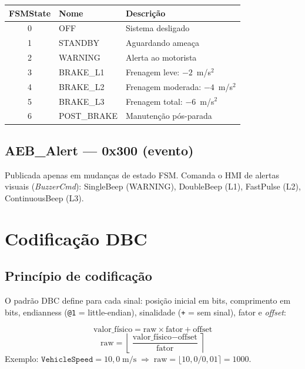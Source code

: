 \documentclass[12pt,a4paper]{article}
\begin{document}
\begin{center}
\begin{tabular}{cll}
  \toprule
  \textbf{FSMState} & \textbf{Nome} & \textbf{Descrição} \\
  \midrule
  0 & OFF       & Sistema desligado \\
  1 & STANDBY   & Aguardando ameaça \\
  2 & WARNING   & Alerta ao motorista \\
  3 & BRAKE\_L1 & Frenagem leve: $-2$~m/s$^2$ \\
  4 & BRAKE\_L2 & Frenagem moderada: $-4$~m/s$^2$ \\
  5 & BRAKE\_L3 & Frenagem total: $-6$~m/s$^2$ \\
  6 & POST\_BRAKE& Manutenção pós-parada \\
  \bottomrule
\end{tabular}
\end{center}

\subsection{AEB\_Alert --- 0x300 (evento)}

Publicada apenas em mudanças de estado FSM. Comanda o HMI de alertas
visuais (\textit{BuzzerCmd}): SingleBeep (WARNING), DoubleBeep (L1),
FastPulse (L2), ContinuousBeep (L3).

\section{Codificação DBC}
\label{sec:codificacao}

\subsection{Princípio de codificação}

O padrão DBC define para cada sinal: posição inicial em bits, comprimento
em bits, endianness (\texttt{@1} = little-endian), sinalidade
(\texttt{+} = sem sinal), fator e \textit{offset}:

\begin{tcolorbox}[equacaobox, title={Fórmula DBC}]
\begin{equation}
  \text{valor\_físico} = \text{raw} \times \text{fator} + \text{offset}
\end{equation}
\begin{equation}
  \text{raw} = \left\lfloor \frac{\text{valor\_físico} - \text{offset}}
                                  {\text{fator}} \right\rceil
\end{equation}
Exemplo: $\texttt{VehicleSpeed} = 10{,}0\;\text{m/s}
  \;\Rightarrow\; \text{raw} = \lfloor 10{,}0 / 0{,}01 \rceil = 1000$.
\end{tcolorbox}
\end{document}
